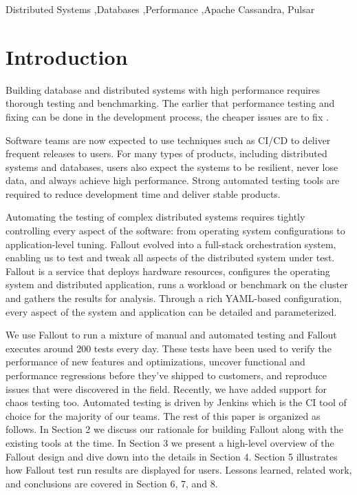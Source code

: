 \documentclass[a4paper,fleqn]{cas-dc}
\begin{document}
\begin{keywords}
Distributed Systems \sep Databases \sep Performance \sep Apache Cassandra, Pulsar
\end{keywords}

\maketitle

\section{Introduction}\label{}

Building database and distributed systems with high performance requires thorough testing and
benchmarking. The earlier that performance testing and fixing can be done in the development
process, the cheaper issues are to fix \cite{Boehm}.

Software teams are now expected to use techniques such as CI/CD \cite{CONTINUOUS} to deliver
frequent releases to users. For many types of products, including distributed systems and databases,
users also expect the systems to be resilient, never lose data, and always achieve high performance.
Strong automated testing tools are required to reduce development time and deliver stable products.

Automating the testing of complex distributed systems requires tightly controlling every aspect of
the software: from operating system configurations to application-level tuning. Fallout evolved into
a full-stack orchestration system, enabling us to test and tweak all aspects of the distributed
system under test. Fallout is a service that deploys hardware resources, configures the operating
system and distributed application, runs a workload or benchmark on the cluster and gathers the
results for analysis. Through a rich YAML-based configuration, every aspect of the system and
application can be detailed and parameterized.

We use Fallout to run a mixture of manual and automated testing and Fallout executes around 200
tests every day. These tests have been used to verify the performance of new features and
optimizations, uncover functional and performance regressions before they’ve shipped to customers,
and reproduce issues that were discovered in the field. Recently, we have added support for chaos
testing too. Automated testing is driven by Jenkins which is the CI tool of choice for the majority
of our teams. The rest of this paper is organized as follows. In Section 2 we discuss our rationale
for building Fallout along with the existing tools at the time. In Section 3 we present a high-level
overview of the Fallout design and dive down into the details in Section 4. Section 5 illustrates
how Fallout test run results are displayed for users. Lessons learned, related work, and conclusions
are covered in Section 6, 7, and 8.
\end{document}

